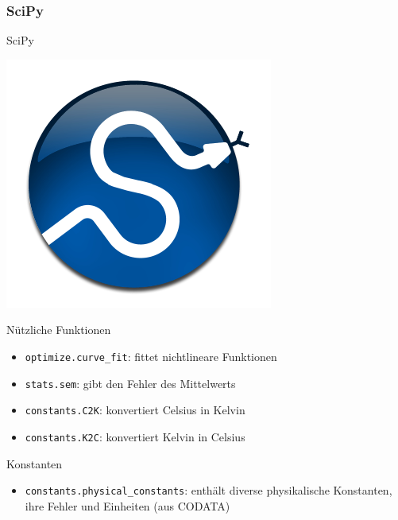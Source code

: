 \subsubsection{SciPy}
\begin{frame}{SciPy}
  \begin{center}
    \includegraphics{../Notes/img/scipy.pdf}
  \end{center}
\end{frame}

\begin{frame}{Nützliche Funktionen}
  \begin{itemize}
    \item \texttt{optimize.curve\_fit}: fittet nichtlineare Funktionen
    \item \texttt{stats.sem}: gibt den Fehler des Mittelwerts
    \item \texttt{constants.C2K}: konvertiert Celsius in Kelvin
    \item \texttt{constants.K2C}: konvertiert Kelvin in Celsius
  \end{itemize}
\end{frame}

\begin{frame}{Konstanten}
  \begin{itemize}
    \item \texttt{constants.physical\_constants}: enthält diverse physikalische Konstanten, ihre Fehler und Einheiten (aus CODATA)
  \end{itemize}
\end{frame}

